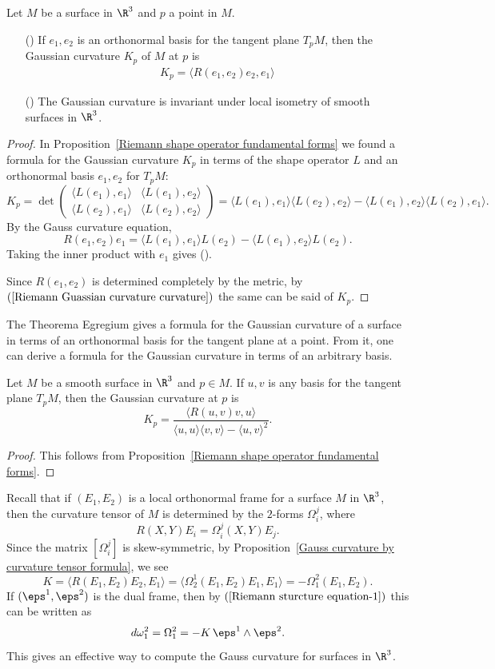 \begin{theorem}
Let $M$ be a surface in $\R^3$ and $p$ a point in $M$.
\begin{itemize}
\item[(\rmnum{1})] If $e_1,e_2$ is an orthonormal basis for the tangent plane $T_pM$, then the Gaussian curvature $K_p$ of $M$ at $p$ is
\begin{align}\label{Riemann Guassian curvature curvature}
K_p=\langle R(e_1,e_2)e_2,e_1\rangle
\end{align}
\item[(\rmnum{2})] The Gaussian curvature is invariant under local isometry of smooth surfaces in $\R^3$. 
\end{itemize}
\end{theorem}
\begin{proof}
In Proposition~\ref{Riemann shape operator fundamental forms} we found a formula for the Gaussian curvature $K_p$ in terms of the shape operator $L$ and an orthonormal basis $e_1,e_2$ for $T_pM$:
\[K_p=\det\begin{pmatrix}
\langle L(e_1),e_1\rangle&\langle L(e_1),e_2\rangle\\
\langle L(e_2),e_1\rangle&\langle L(e_2),e_2\rangle
\end{pmatrix}=\langle L(e_1),e_1\rangle\langle L(e_2),e_2\rangle-\langle L(e_1),e_2\rangle\langle L(e_2),e_1\rangle.\]
By the Gauss curvature equation,
\[R(e_1,e_2)e_1=\langle L(e_1),e_1\rangle L(e_2)-\langle L(e_1),e_2\rangle L(e_2).\]
Taking the inner product with $e_1$ gives ().\par
Since $R(e_1,e_2)$ is determined completely by the metric, by $(\ref{Riemann Guassian curvature curvature})$ the same can be said of $K_p$.
\end{proof}
The Theorema Egregium gives a formula for the Gaussian curvature of a surface in terms of an orthonormal basis for the tangent plane at a point. From it, one can 
derive a formula for the Gaussian curvature in terms of an arbitrary basis.
\begin{proposition}\label{Gauss curvature by curvature tensor formula}
Let $M$ be a smooth surface in $\R^3$ and $p\in M$. If $u,v$ is any basis for the tangent plane $T_pM$, then the Gaussian curvature at $p$ is
\[K_p=\frac{\langle R(u,v)v,u\rangle}{\langle u,u\rangle\langle v,v\rangle-\langle u,v\rangle^2}.\]
\end{proposition}
\begin{proof}
This follows from Proposition~\ref{Riemann shape operator fundamental forms}.
\end{proof}
Recall that if $(E_1,E_2)$ is a local orthonormal frame for a surface $M$ in $\R^3$, then the curvature tensor of $M$ is determined by the $2$-forms $\Omega_i^j$, where
\[R(X,Y)E_i=\Omega_i^j(X,Y)E_j.\]
Since the matrix $[\Omega_i^j]$ is skew-symmetric, by Proposition~\ref{Gauss curvature by curvature tensor formula}, we see
\[K=\langle R(E_1,E_2)E_2,E_1\rangle=\langle\Omega_2^1(E_1,E_2)E_1,E_1\rangle=-\Omega_1^2(E_1,E_2).\]
If $(\eps^1,\eps^2)$ is the dual frame, then by $(\ref{Riemann sturcture equation-1})$ this can be written as
\[d\omega_1^2=\Omega_1^2=-K\,\eps^1\wedge\eps^2.\]
This gives an effective way to compute the Gauss curvature for surfaces in $\R^3$.
